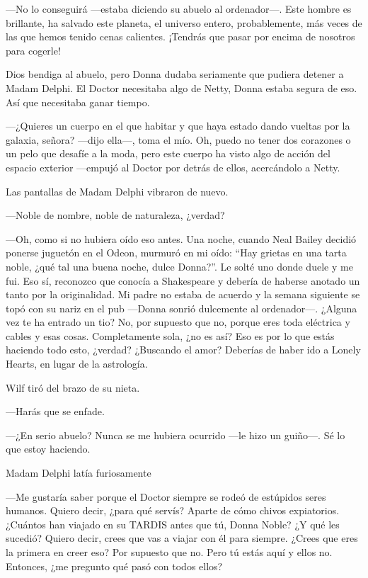---No lo conseguirá ---estaba diciendo su abuelo al ordenador---. Este
hombre es brillante, ha salvado este planeta, el universo entero,
probablemente, más veces de las que hemos tenido cenas calientes.
¡Tendrás que pasar por encima de nosotros para cogerle!

Dios bendiga al abuelo, pero Donna dudaba seriamente que pudiera detener
a Madam Delphi. El Doctor necesitaba algo de Netty, Donna estaba segura
de eso. Así que necesitaba ganar tiempo.

---¿Quieres un cuerpo en el que habitar y que haya estado dando vueltas
por la galaxia, señora? ---dijo ella---, toma el mío. Oh, puedo no tener
dos corazones o un pelo que desafíe a la moda, pero este cuerpo ha visto
algo de acción del espacio exterior ---empujó al Doctor por detrás de
ellos, acercándolo a Netty.

Las pantallas de Madam Delphi vibraron de nuevo.

---Noble de nombre, noble de naturaleza, ¿verdad?

---Oh, como si no hubiera oído eso antes. Una noche, cuando Neal Bailey
decidió ponerse juguetón en el Odeon, murmuró en mi oído: ``Hay grietas
en una tarta noble, ¿qué tal una buena noche, dulce Donna?''. Le solté
uno donde duele y me fui. Eso sí, reconozco que conocía a Shakespeare y
debería de haberse anotado un tanto por la originalidad. Mi padre no
estaba de acuerdo y la semana siguiente se topó con su nariz en el pub
---Donna sonrió dulcemente al ordenador---. ¿Alguna vez te ha entrado un
tio? No, por supuesto que no, porque eres toda eléctrica y cables y
esas cosas. Completamente sola, ¿no es así? Eso es por lo que estás
haciendo todo esto, ¿verdad? ¿Buscando el amor? Deberías de haber ido
a Lonely Hearts, en lugar de la astrología.

Wilf tiró del brazo de su nieta.

---Harás que se enfade.

---¿En serio abuelo? Nunca se me hubiera ocurrido ---le hizo un
guiño---. Sé lo que estoy haciendo.

Madam Delphi latía furiosamente

---Me gustaría saber porque el Doctor siempre se rodeó de estúpidos
seres humanos. Quiero decir, ¿para qué servís? Aparte de cómo chivos
expiatorios. ¿Cuántos han viajado en su TARDIS antes que tú, Donna
Noble? ¿Y qué les sucedió? Quiero decir, crees que vas a viajar con él
para siempre. ¿Crees que eres la primera en creer eso? Por supuesto que
no. Pero tú estás aquí y ellos no. Entonces, ¿me pregunto qué pasó con
todos ellos?

